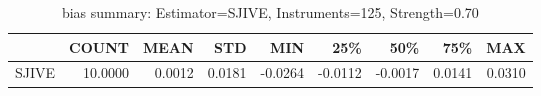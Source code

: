 \begin{table}[ht]
\centering
\caption{bias summary: Estimator=SJIVE, Instruments=125, Strength=0.70}
\begin{tabular}{lrrrrrrrr}
\toprule
 & COUNT & MEAN & STD & MIN & 25\% & 50\% & 75\% & MAX \\
\midrule
SJIVE & 10.0000 & 0.0012 & 0.0181 & -0.0264 & -0.0112 & -0.0017 & 0.0141 & 0.0310 \\
\bottomrule
\end{tabular}
\end{table}
